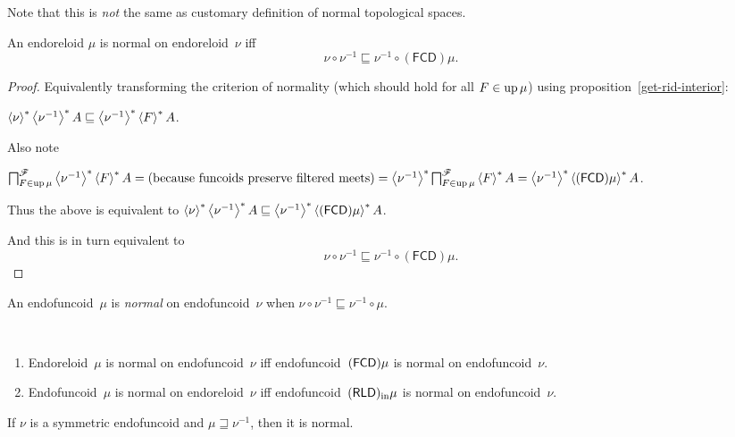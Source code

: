 Note that this is \emph{not} the same as customary definition of normal topological spaces.

\begin{thm}
  An endoreloid $\mu$ is normal on endoreloid~$\nu$ iff
  \[ \nu \circ \nu^{-1} \sqsubseteq
  \nu^{-1} \circ (\mathsf{FCD}) \mu. \]
\end{thm}

\begin{proof}
  Equivalently transforming the criterion of normality (which should hold for
  all $F \in \operatorname{up} \mu$) using proposition~\ref{get-rid-interior}:

  $\left\langle \nu\right\rangle ^{\ast}
  \left\langle \nu^{-1}\right\rangle ^{\ast} A \sqsubseteq
  \left\langle \nu^{-1}\right\rangle ^{\ast} \left\langle F\right\rangle ^{\ast} A$.

  Also note
  
  $\bigsqcap^{\mathscr{F}}_{F \in \operatorname{up} \mu} \left\langle  \nu^{-1}
  \right\rangle ^{\ast} \left\langle F\right\rangle ^{\ast} A = \text{(because funcoids preserve
  filtered meets)} = \left\langle  \nu^{-1}
  \right\rangle ^{\ast}  \bigsqcap^{\mathscr{F}}_{F \in \operatorname{up} \mu} \left\langle F\right\rangle ^{\ast} A =
  \left\langle  \nu^{-1} \right\rangle ^{\ast}
  \left\langle  (\mathsf{FCD}) \mu \right\rangle ^{\ast} A$.

  Thus the above is equivalent to
  $\left\langle \nu\right\rangle ^{\ast}
  \left\langle \nu^{-1}\right\rangle ^{\ast} A \sqsubseteq
  \left\langle  \nu^{-1} \right\rangle ^{\ast}
  \left\langle  (\mathsf{FCD}) \mu \right\rangle ^{\ast} A$.

  And this is in turn equivalent to
  \[ \nu \circ \nu^{-1} \sqsubseteq
  \nu^{-1} \circ (\mathsf{FCD}) \mu. \]
\end{proof}

\begin{defn}
An endofuncoid~$\mu$ is \emph{normal} on endofuncoid~$\nu$ when $\nu \circ \nu^{-1} \sqsubseteq \nu^{-1} \circ \mu$.
\end{defn}

\begin{obvious}\label{norm-fcd-rld}
~
\begin{enumerate}
\item Endoreloid~$\mu$ is normal on endofuncoid~$\nu$ iff endofuncoid~$(\mathsf{FCD})\mu$ is normal on endofuncoid~$\nu$.
\item Endofuncoid~$\mu$ is normal on endoreloid~$\nu$ iff endofuncoid~$(\mathsf{RLD})_{\mathrm{in}}\mu$ is normal on endofuncoid~$\nu$.
\end{enumerate}
\end{obvious}

\begin{cor}
If $\nu$ is a symmetric endofuncoid and $\mu\sqsupseteq \nu^{-1}$, then it is normal.
\end{cor}


